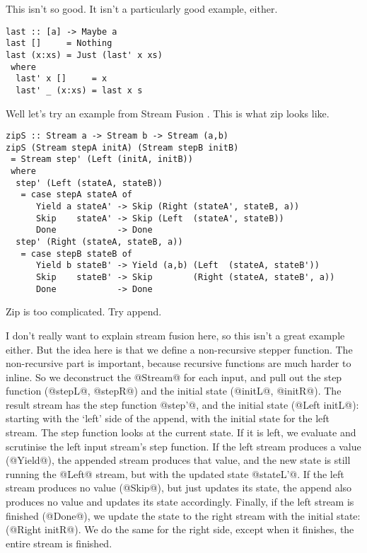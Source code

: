 This isn't so good.
It isn't a particularly good example, either.

\begin{lstlisting}
last :: [a] -> Maybe a
last []     = Nothing
last (x:xs) = Just (last' x xs)
 where
  last' x []     = x
  last' _ (x:xs) = last x s
\end{lstlisting}

Well let's try an example from Stream Fusion \cite{coutts2007stream}.
This is what zip looks like.

\begin{lstlisting}
zipS :: Stream a -> Stream b -> Stream (a,b)
zipS (Stream stepA initA) (Stream stepB initB)
 = Stream step' (Left (initA, initB))
 where
  step' (Left (stateA, stateB))
   = case stepA stateA of
      Yield a stateA' -> Skip (Right (stateA', stateB, a))
      Skip    stateA' -> Skip (Left  (stateA', stateB))
      Done            -> Done
  step' (Right (stateA, stateB, a))
   = case stepB stateB of
      Yield b stateB' -> Yield (a,b) (Left  (stateA, stateB'))
      Skip    stateB' -> Skip        (Right (stateA, stateB', a))
      Done            -> Done
\end{lstlisting}

Zip is too complicated. Try append.

I don't really want to explain stream fusion here, so this isn't a great example either.
But the idea here is that we define a non-recursive stepper function. The non-recursive part is important, because recursive functions are much harder to inline.
So we deconstruct the @Stream@ for each input, and pull out the step function (@stepL@, @stepR@) and the initial state (@initL@, @initR@).
The result stream has the step function @step'@, and the initial state (@Left initL@): starting with the `left' side of the append, with the initial state for the left stream.
The step function looks at the current state.
If it is left, we evaluate and scrutinise the left input stream's step function.
If the left stream produces a value (@Yield@), the appended stream produces that value, and the new state is still running the @Left@ stream, but with the updated state @stateL'@.
If the left stream produces no value (@Skip@), but just updates its state, the append also produces no value and updates its state accordingly.
Finally, if the left stream is finished (@Done@), we update the state to the right stream with the initial state: (@Right initR@).
We do the same for the right side, except when it finishes, the entire stream is finished.

